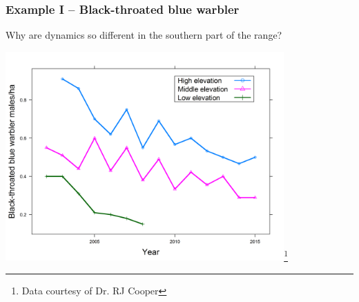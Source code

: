 \documentclass[color=usenames,dvipsnames]{beamer}
\begin{document}
\begin{frame}[fragile]
  \frametitle{Example I -- Black-throated blue warbler}
  {\centering \small %
    Why are dynamics so different in the southern part of
    the range? \\}
\begin{center}
\includegraphics[width=0.8\textwidth]{figs/blue_density3plots}\let\thefootnote\relax\footnote{\tiny
    Data courtesy of Dr. RJ Cooper} 
\end{center}
\end{frame}
\end{document}
